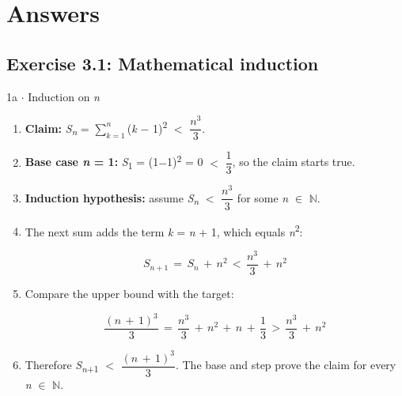 \documentclass[11pt]{article}
\begin{document}
\clearpage
\section{Answers}
\begin{keepsection}\subsection{Exercise 3.1: Mathematical induction}

\begin{workedbox}{1a \ensuremath{\cdot} Induction on \textit{n}}
\begin{enumerate}
\item \textbf{Claim:} \textit{S}\textsubscript{\textit{n}} = $\sum_{{k}=1}^{{n}} $(\textit{k} \ensuremath{-} 1)\textsuperscript{2} \ensuremath{<} {\small\ensuremath{\dfrac{{n}^{3}}{3}}}.
\item \textbf{Base case \textit{n} = 1:} \textit{S}\textsubscript{1} = (1\ensuremath{-}1)\textsuperscript{2} = 0 \ensuremath{<} {\small\ensuremath{\dfrac{1}{3}}}, so the claim starts true.
\item \textbf{Induction hypothesis:} assume \textit{S}\textsubscript{\textit{n}} \ensuremath{<} {\small\ensuremath{\dfrac{{n}^{3}}{3}}} for some \textit{n} \ensuremath{\in} \ensuremath{\mathbb{N}}.
\item {}
The next sum adds the term \textit{k} = \textit{n} + 1, which equals \textit{n}\textsuperscript{2}:

\begin{equation*}{S}_{{n}+1}\, =\, {S}_{{n}}\, +\, {n}^{2}\, <\, \dfrac{{n}^{3}}{3}\, +\, {n}^{2}\end{equation*}
\item {}
Compare the upper bound with the target:

\begin{equation*}\dfrac{({n}\, +\, 1)^{3}}{3}\, =\, \dfrac{{n}^{3}}{3}\, +\, {n}^{2}\, +\, {n}\, +\, \dfrac{1}{3}\, >\, \dfrac{{n}^{3}}{3}\, +\, {n}^{2}\end{equation*}
\item Therefore \textit{S}\textsubscript{\textit{n}+1} \ensuremath{<} {\small\ensuremath{\dfrac{({n}\, +\, 1)^{3}}{3}}}. The base and step prove the claim for every \textit{n} \ensuremath{\in} \ensuremath{\mathbb{N}}.
\end{enumerate}
\end{workedbox}

\end{keepsection}
\end{document}
